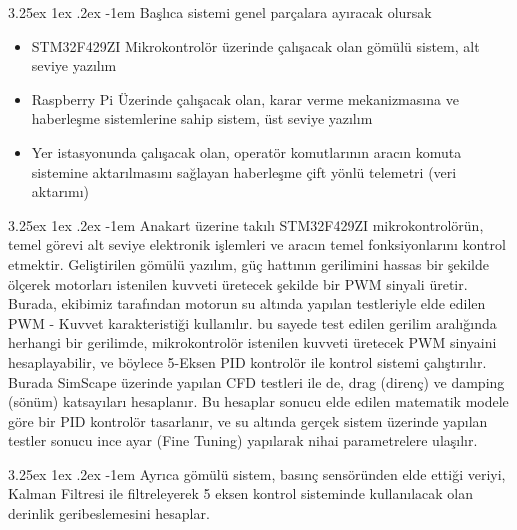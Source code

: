 \documentclass[12pt]{article}
\makeatletter
\newcounter{subsubsubsection}[subsubsection]
\renewcommand\paragraph{\@startsection{paragraph}{5}{\z@}%
  {3.25ex \@plus1ex \@minus.2ex}%
  {-1em}%
  {\normalfont\normalsize\bfseries}}
\makeatother
\begin{document}
\paragraph{} Başlıca sistemi genel parçalara ayıracak olursak
\begin{itemize}
    \item STM32F429ZI Mikrokontrolör üzerinde çalışacak olan gömülü sistem, alt seviye yazılım
    \item Raspberry Pi Üzerinde çalışacak olan, karar verme mekanizmasına ve haberleşme sistemlerine sahip sistem, üst seviye yazılım
    \item Yer istasyonunda çalışacak olan, operatör komutlarının aracın komuta sistemine aktarılmasını sağlayan haberleşme çift yönlü telemetri (veri aktarımı)
\end{itemize}


 \paragraph{}  Anakart üzerine takılı STM32F429ZI mikrokontrolörün, temel görevi alt seviye elektronik işlemleri ve aracın temel fonksiyonlarını kontrol etmektir. Geliştirilen gömülü yazılım, güç hattının gerilimini hassas bir şekilde ölçerek motorları istenilen kuvveti üretecek şekilde bir PWM sinyali üretir. Burada, ekibimiz tarafından motorun su altında yapılan testleriyle elde edilen PWM - Kuvvet karakteristiği kullanılır. bu sayede test edilen gerilim aralığında herhangi bir gerilimde, mikrokontrolör istenilen kuvveti üretecek PWM sinyaini hesaplayabilir, ve böylece 5-Eksen PID kontrolör ile kontrol sistemi çalıştırılır. Burada SimScape üzerinde yapılan CFD testleri ile de, drag (direnç) ve damping (sönüm) katsayıları hesaplanır. Bu hesaplar sonucu elde edilen matematik modele göre bir PID kontrolör tasarlanır, ve su altında gerçek sistem üzerinde yapılan testler sonucu ince ayar (Fine Tuning) yapılarak nihai parametrelere ulaşılır. 

\paragraph{} Ayrıca gömülü sistem, basınç sensöründen elde ettiği veriyi, Kalman Filtresi ile filtreleyerek 5 eksen kontrol sisteminde kullanılacak olan derinlik geribeslemesini hesaplar.

\end{document}
